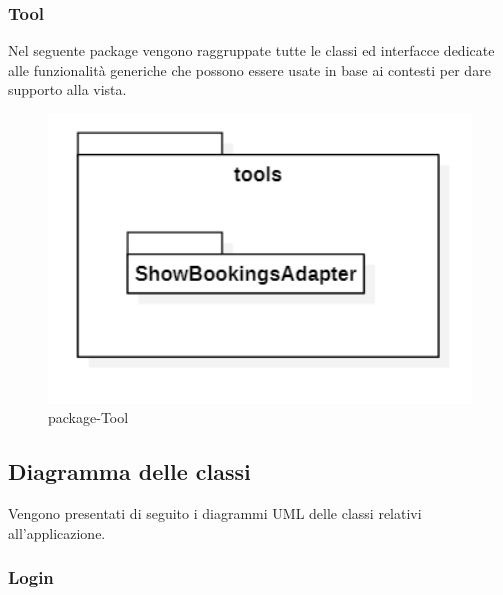 \subsubsection{Tool}
Nel seguente package vengono raggruppate tutte le classi ed interfacce dedicate alle funzionalità generiche che possono essere usate in base ai contesti per dare supporto alla vista.
\begin{figure}[H]
	\centering
	\includegraphics[width=16cm]{res/images/apputenti-packageTools.png}
	\caption{package-Tool}
	\label{fig:package-Tool}
\end{figure}

\subsection{Diagramma delle classi}
Vengono presentati di seguito i diagrammi UML delle classi relativi all'applicazione.

\subsubsection{Login}

